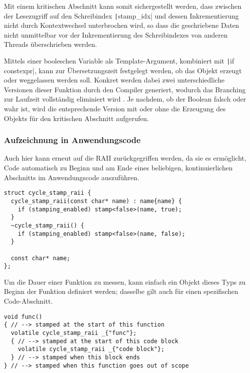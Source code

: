 
Mit einem kritischen Abschnitt kann somit sichergestellt werden, dass zwischen
der Lesezugriff auf den Schreibindex \texttt|stamp_idx| und dessen
Inkrementierung nicht durch Kontextwechsel unterbrochen wird, so dass die
geschriebene Daten nicht unmittelbar vor der Inkrementierung des Schreibindexes
von anderen Threads überschrieben werden.

Mittels einer booleschen Variable als Template-Argument, kombiniert mit
\texttt|if constexpr|, kann zur Übersetzungszeit festgelegt werden, ob
das Objekt erzeugt oder weggelassen werden soll. Konkret werden dabei zwei
unterschiedliche Versionen dieser Funktion durch den Compiler generiert, wodurch
das Branching zur Laufzeit vollständig eliminiert wird
\cite{cppreference_constexpr_if}. Je nachdem, ob der Boolean falsch oder wahr
ist, wird die entsprechende Version mit oder ohne die Erzeugung des Objekts für
den kritischen Abschnitt aufgerufen.

\subsubsection{Aufzeichnung in Anwendungscode}

Auch hier kann erneut auf die RAII zurückgegriffen werden, da sie es ermöglicht,
Code automatisch zu Beginn und am Ende eines beliebigen, kontinuierlichen
Abschnitts im Anwendungscode auszuführen.

\begin{code}
\begin{verbatim}
struct cycle_stamp_raii {
  cycle_stamp_raii(const char* name) : name{name} {
    if (stamping_enabled) stamp<false>(name, true);
  }
  ~cycle_stamp_raii() {
    if (stamping_enabled) stamp<false>(name, false);
  }

  const char* name;
};
\end{verbatim}
\end{code}

Um die Dauer einer Funktion zu messen, kann einfach ein Objekt dieses Typs zu
Beginn der Funktion definiert werden; dasselbe gilt auch für einen spezifischen
Code-Abschnitt.

\begin{code}
\begin{verbatim}
void func()
{ // --> stamped at the start of this function
  volatile cycle_stamp_raii _{"func"};
  { // --> stamped at the start of this code block
    volatile cycle_stamp_raii _{"code block"};
  } // --> stamped when this block ends
} // --> stamped when this function goes out of scope
\end{verbatim}
\end{code}

